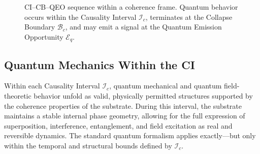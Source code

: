 \documentclass[entropy,article,submit,pdftex,moreauthors]{Definitions/mdpi}
\begin{document}
\begin{figure}[h!]
\centering
{}
\caption{CI–CB–QEO sequence within a coherence frame. Quantum behavior occurs within the Causality Interval \( \mathcal{I}_c \), terminates at the Collapse Boundary \( \mathcal{B}_c \), and may emit a signal at the Quantum Emission Opportunity \( \mathcal{E}_q \).}
\label{fig:cicbqeo}
\end{figure}


\subsection{Quantum Mechanics Within the CI}
\label{subsec:qminci}

Within each Causality Interval \( \mathcal{I}_c \), quantum mechanical and quantum field-theoretic behavior unfold as valid, physically permitted structures supported by the coherence properties of the substrate. During this interval, the substrate maintains a stable internal phase geometry, allowing for the full expression of superposition, interference, entanglement, and field excitation as real and reversible dynamics. The standard quantum formalism applies exactly—but only within the temporal and structural bounds defined by \( \mathcal{I}_c \).
\end{document}
